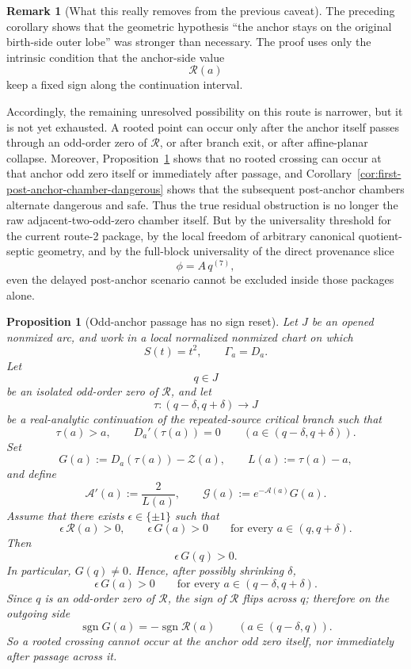 \documentclass[11pt,a4paper]{amsart}
\theoremstyle{plain}
\newtheorem{proposition}[theorem]{Proposition}
\theoremstyle{definition}
\newtheorem{remark}[theorem]{Remark}
\begin{document}
\begin{remark}[What this really removes from the previous caveat]
\label{rem:what-anchor-sign-preservation-removes}
The preceding corollary shows that the geometric hypothesis
``the anchor stays on the original birth-side outer lobe'' was stronger than
necessary. The proof uses only the intrinsic condition that the anchor-side
value
\[
\mathcal R(a)
\]
keep a fixed sign along the continuation interval.

Accordingly, the remaining unresolved possibility on this route is narrower, but
it is not yet exhausted. A rooted point can occur only after the anchor itself
passes through an odd-order zero of $\mathcal R$, or after branch exit, or after
affine-planar collapse. Moreover,
Proposition~\ref{prop:odd-anchor-passage-no-reset} shows that no rooted crossing
can occur at that anchor odd zero itself or immediately after passage, and
Corollary~\ref{cor:first-post-anchor-chamber-dangerous} shows that the
subsequent post-anchor chambers alternate dangerous and safe. Thus the true residual obstruction is no longer the raw adjacent-two-odd-zero
chamber itself. But by the universality threshold for the current route-2
package, by the local freedom of arbitrary canonical quotient-septic geometry,
and by the full-block universality of the direct provenance slice
\[
\phi=A\,q^{(7)},
\]
even the delayed post-anchor scenario cannot be excluded inside those packages
alone.
\end{remark}

\begin{proposition}[Odd-anchor passage has no sign reset]
\label{prop:odd-anchor-passage-no-reset}
Let $J$ be an opened nonmixed arc, and work in a local normalized nonmixed
chart on which
\[
S(t)=t^2,
\qquad
\Gamma_a=D_a.
\]
Let
\[
q\in J
\]
be an isolated odd-order zero of $\mathcal R$, and let
\[
\tau:(q-\delta,q+\delta)\to J
\]
be a real-analytic continuation of the repeated-source critical branch such that
\[
\tau(a)>a,
\qquad
D_a'(\tau(a))=0
\qquad (a\in(q-\delta,q+\delta)).
\]
Set
\[
G(a):=D_a(\tau(a))-\mathcal Z(a),
\qquad
L(a):=\tau(a)-a,
\]
and define
\[
\mathcal A'(a):=\frac{2}{L(a)},
\qquad
\mathscr G(a):=e^{-\mathcal A(a)}G(a).
\]
Assume that there exists $\epsilon\in\{\pm1\}$ such that
\[
\epsilon\,\mathcal R(a)>0,
\qquad
\epsilon\,G(a)>0
\qquad\text{for every }a\in(q,q+\delta).
\]
Then
\[
\epsilon\,G(q)>0.
\]
In particular, $G(q)\neq 0$. Hence, after possibly shrinking $\delta$,
\[
\epsilon\,G(a)>0
\qquad\text{for every }a\in(q-\delta,q+\delta).
\]
Since $q$ is an odd-order zero of $\mathcal R$, the sign of $\mathcal R$ flips
across $q$; therefore on the outgoing side
\[
\operatorname{sgn}G(a)=-\operatorname{sgn}\mathcal R(a)
\qquad (a\in(q-\delta,q)).
\]
So a rooted crossing cannot occur at the anchor odd zero itself, nor
immediately after passage across it.
\end{proposition}
\end{document}
